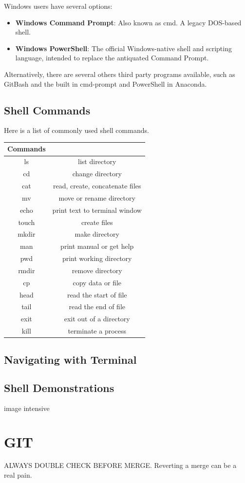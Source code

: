 \noindent Windows users have several options:
\begin{itemize}
	\item \textbf{Windows Command Prompt}: Also known as cmd. A legacy DOS-based shell.
	\item \textbf{Windows PowerShell}: The official Windows-native shell and scripting language, intended to replace the antiquated Command Prompt. 
\end{itemize}

\noindent Alternatively, there are several others third party programs available, such as GitBash and the built in cmd-prompt and PowerShell in Anaconda.

\subsection{Shell Commands}

Here is a list of commonly used shell commands.

\begin{tabular}{|c|c|}
	\hline
	Commands &  \\
	\hline
	ls & list directory \\
	\hline
	cd & change directory \\
	\hline
	cat & read, create, concatenate files \\
	\hline
	mv & move or rename directory \\
	\hline
	echo & print text to terminal window \\
	\hline
	touch & create files \\
	\hline
	mkdir & make directory \\
	\hline
	man & print manual or get help \\
	\hline
	pwd & print working directory \\
	\hline
	rmdir & remove directory \\
	\hline
	cp & copy data or file \\
	\hline
	head & read the start of file \\
	\hline
	tail & read the end of file \\
	\hline
	exit & exit out of a directory \\
	\hline
	kill & terminate a process \\
	\hline
\end{tabular}
\subsection{Navigating with Terminal}
\subsection{Shell Demonstrations}
image intensive
\section{GIT}
ALWAYS DOUBLE CHECK BEFORE MERGE. Reverting a merge can be a real pain.